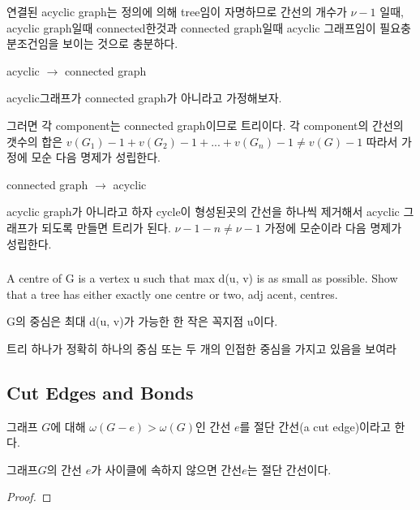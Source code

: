 연결된 acyclic graph는 정의에 의해 tree임이 자명하므로 간선의 개수가 $\nu -1$  일때, acyclic graph일때 connected한것과 connected graph일때 acyclic 그래프임이 필요충분조건임을 보이는 것으로 충분하다.

acyclic $\rightarrow$ connected graph

acyclic그래프가 connected graph가 아니라고 가정해보자.

그러면 각 component는 connected graph이므로 트리이다.
각 component의 간선의 갯수의 합은 $v(G_1)-1 + v(G_2)-1 + ... + v(G_n)-1 \neq v(G)-1 $
따라서 가정에 모순 다음 명제가 성립한다.

connected graph $\rightarrow$ acyclic

acyclic graph가 아니라고 하자 cycle이 형성된곳의 간선을 하나씩 제거해서 acyclic 그래프가 되도록 만들면 트리가 된다.
$\nu-1-n \neq \nu -1 $ 가정에 모순이라 다음 명제가 성립한다.
\subsubsection{} 
%
\subsubsection{} 
%
\subsubsection{} 
A centre of G is a vertex u such that max d(u, v) is as small as possible.
Show that a tree has either exactly one centre or two,
adj acent, centres.


G의 중심은 최대 d(u, v)가 가능한 한 작은 꼭지점 u이다.

트리 하나가 정확히 하나의 중심 또는 두 개의 인접한 중심을 가지고 있음을 보여라

\subsection{Cut Edges and Bonds}
\begin{dfn}
    
    그래프 $G$에 대해 $\omega(G-e)>\omega(G)$인 간선 $e$를 절단 간선(a cut edge)이라고 한다.

\end{dfn}

\begin{theorem}
    그래프$G$의 간선 $e$가 사이클에 속하지 않으면 간선$e$는 절단 간선이다.
\end{theorem}

\begin{proof}
    
\end{proof}


